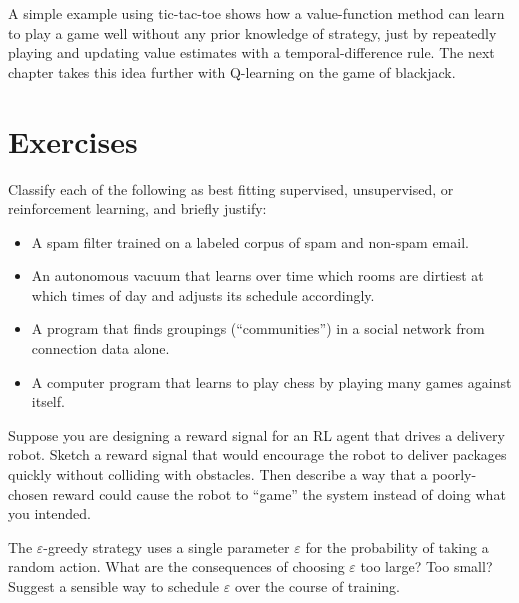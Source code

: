 \documentclass[../../book.tex]{subfiles}
\begin{document}
A simple example using tic-tac-toe shows how a value-function method can learn to play a game well without any prior knowledge of strategy, just by repeatedly playing and updating value estimates with a temporal-difference rule.  The next chapter takes this idea further with Q-learning on the game of blackjack.

\section{Exercises}

\begin{ex}\label{ex:rl_classify}
Classify each of the following as best fitting supervised, unsupervised, or reinforcement learning, and briefly justify:
\begin{itemize}
    \item A spam filter trained on a labeled corpus of spam and non-spam email.
    \item An autonomous vacuum that learns over time which rooms are dirtiest at which times of day and adjusts its schedule accordingly.
    \item A program that finds groupings (``communities'') in a social network from connection data alone.
    \item A computer program that learns to play chess by playing many games against itself.
\end{itemize}
\end{ex}

\begin{ex}\label{ex:reward_design}
Suppose you are designing a reward signal for an RL agent that drives a delivery robot.  Sketch a reward signal that would encourage the robot to deliver packages quickly without colliding with obstacles.  Then describe a way that a poorly-chosen reward could cause the robot to ``game'' the system instead of doing what you intended.
\end{ex}

\begin{ex}\label{ex:exploration_strategy}
The $\varepsilon$-greedy strategy uses a single parameter $\varepsilon$ for the probability of taking a random action.  What are the consequences of choosing $\varepsilon$ too large?  Too small?  Suggest a sensible way to schedule $\varepsilon$ over the course of training.
\end{ex}
\end{document}
